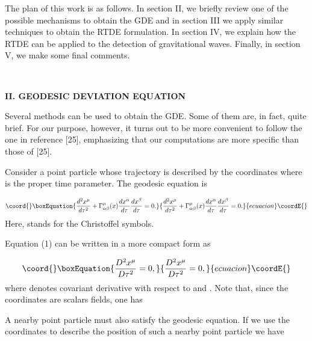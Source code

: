\documentclass[a4paper,12pt]{article}
\begin{document}
The plan of this work is as follows. In section II, we briefly review one of
the possible mechanisms to obtain the GDE and in section III we apply
similar techniques to obtain the RTDE formulation. In section IV, we explain
how the RTDE can be applied to the detection of gravitational waves.
Finally, in section V, we make some final comments.

\bigskip \smallskip \bigskip\ 

\noindent \textbf{II. GEODESIC DEVIATION EQUATION}

\bigskip

Several methods can be used to obtain the GDE. Some of them are, in fact,
quite brief. For our purpose, however, it turns out to be more convenient to
follow the one in reference [25], emphasizing that our computations are more
specific than those of [25].

Consider a point particle whose trajectory is described by the coordinates \coordHE{} where \myHighlight{$\tau$}\coordHE{} is the proper time parameter. The geodesic
equation is

\begin{equation}\coord{}\boxEquation{
\frac{d^{2}x^{\mu }}{d\tau ^{2}}+\Gamma _{\alpha \beta }^{\mu }(x)\frac{
dx^{\alpha }}{d\tau }\frac{dx^{\beta }}{d\tau }=0.  \label{1}
}{
\frac{d^{2}x^{\mu }}{d\tau ^{2}}+\Gamma _{\alpha \beta }^{\mu }(x)\frac{
dx^{\alpha }}{d\tau }\frac{dx^{\beta }}{d\tau }=0.  }{ecuacion}\coordE{}\end{equation}
Here, \coordHE{} stands for the Christoffel symbols.

Equation (1) can be written in a more compact form as

\begin{equation}\coord{}\boxEquation{
\frac{D^{2}x^{\mu }}{D\tau ^{2}}=0,  \label{2}
}{
\frac{D^{2}x^{\mu }}{D\tau ^{2}}=0,  }{ecuacion}\coordE{}\end{equation}
where \coordHE{} denotes covariant derivative with respect to \myHighlight{$\tau $}\coordHE{}
and \coordHE{}. Note that, since the coordinates \coordHE{} are scalars fields,
one has \coordHE{}

A nearby point particle must also satisfy the geodesic equation. If we use
the coordinates \coordHE{} to describe the position of such a
nearby point particle we have
\end{document}
